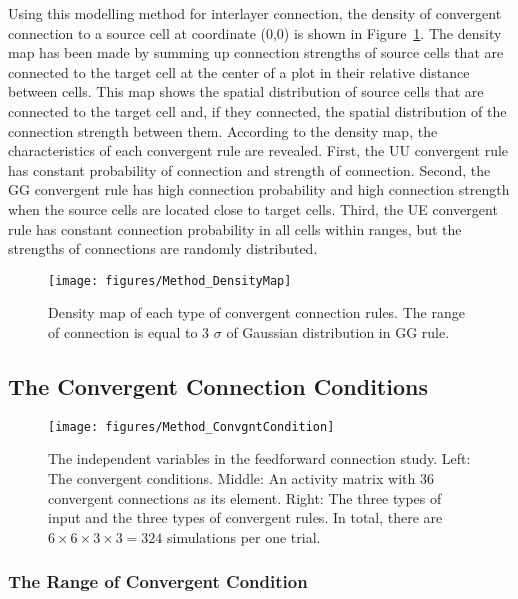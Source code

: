 \begin{enumerate}
\begin{enumerate}
   \end{enumerate}
  \end{enumerate}

Using this modelling method for interlayer connection, the density of convergent connection to a source cell at coordinate (0,0) is shown in Figure~\ref{fig:DenseMap}. The density map has been made by summing up connection strengths of source cells that are connected to the target cell at the center of a plot in their relative distance between cells. This map shows the spatial distribution of source cells that are connected to the target cell and, if they connected, the spatial distribution of the connection strength between them. According to the density map, the characteristics of each convergent rule are revealed. First, the UU convergent rule has constant probability of connection and strength of connection. Second, the GG convergent rule has high connection probability and high connection strength when the source cells are located close to target cells. Third, the UE convergent rule has constant connection probability in all cells within ranges, but the strengths of connections are randomly distributed.



\begin{figure}[!t]
	\centering
	\texttt{[image: figures/Method\_DensityMap]}
	\caption[Density map]{Density map of each type of convergent connection rules. The range of connection is equal to 3 $\sigma$ of Gaussian distribution in GG rule.}
	\label{fig:DenseMap}
\end{figure} 

\subsection{The Convergent Connection Conditions}

\begin{figure}[!ht]
	\centering
	\texttt{[image: figures/Method\_ConvgntCondition]}
	\caption[The independent variables in the feedforward connection study]{The independent variables in the feedforward connection study. Left: The convergent conditions. Middle: An activity matrix with 36 convergent connections as its element. Right: The three types of input and the three types of convergent rules. In total, there are $6\times6\times3\times3 = 324$ simulations per one trial.}
	\label{fig:ConvergentConn}
\end{figure} 

\subsubsection{The Range of Convergent Condition}

